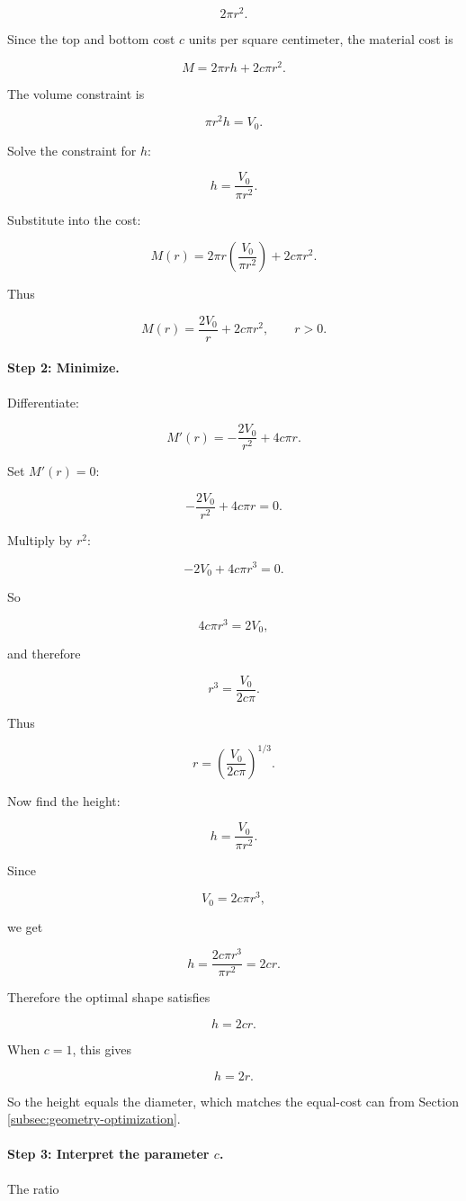 \[
2\pi r^2.
\]

Since the top and bottom cost \(c\) units per square centimeter, the material cost is

\[
M=2\pi rh+2c\pi r^2.
\]

The volume constraint is

\[
\pi r^2h=V_0.
\]

Solve the constraint for \(h\):

\[
h=\frac{V_0}{\pi r^2}.
\]

Substitute into the cost:

\[
M(r)
=
2\pi r\left(\frac{V_0}{\pi r^2}\right)+2c\pi r^2.
\]

Thus

\[
M(r)=\frac{2V_0}{r}+2c\pi r^2,
\qquad r>0.
\]

\paragraph{Step 2: Minimize.}
Differentiate:

\[
M'(r)=-\frac{2V_0}{r^2}+4c\pi r.
\]

Set \(M'(r)=0\):

\[
-\frac{2V_0}{r^2}+4c\pi r=0.
\]

Multiply by \(r^2\):

\[
-2V_0+4c\pi r^3=0.
\]

So

\[
4c\pi r^3=2V_0,
\]

and therefore

\[
r^3=\frac{V_0}{2c\pi}.
\]

Thus

\[
\boxed{
r=\left(\frac{V_0}{2c\pi}\right)^{1/3}.
}
\]

Now find the height:

\[
h=\frac{V_0}{\pi r^2}.
\]

Since

\[
V_0=2c\pi r^3,
\]

we get

\[
h=\frac{2c\pi r^3}{\pi r^2}=2cr.
\]

Therefore the optimal shape satisfies

\[
\boxed{
h=2cr.
}
\]

When \(c=1\), this gives

\[
h=2r.
\]

So the height equals the diameter, which matches the equal-cost can from Section
\ref{subsec:geometry-optimization}.

\paragraph{Step 3: Interpret the parameter \(c\).}
The ratio


